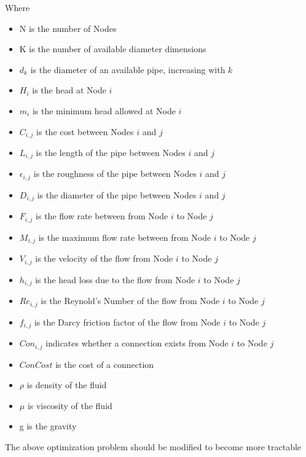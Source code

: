 \documentclass[12pt]{article}
\begin{document}
Where
\begin{itemize}
\item N is the number of Nodes
\item K is the number of available diameter dimensions
\item $d_{k}$ is the diameter of an available pipe, increasing with $k$
\item $H_{i}$ is the head at Node $i$
\item $m_{i}$ is the minimum head allowed at Node $i$
\item $C_{i,j}$ is the cost between Nodes $i$ and $j$
\item $L_{i,j}$ is the length of the pipe between Nodes $i$ and $j$
\item $\epsilon_{i,j}$ is the roughness of the pipe between Nodes $i$ and $j$
\item $D_{i,j}$ is the diameter of the pipe between Nodes $i$ and $j$
\item $F_{i,j}$ is the flow rate between from Node $i$ to Node $j$
\item $M_{i,j}$ is the maximum flow rate between from Node $i$ to Node $j$
\item $V_{i,j}$ is the velocity of the flow from Node $i$ to Node $j$
\item $h_{i,j}$ is the head loss due to the flow from Node $i$ to Node $j$
\item $Re_{i,j}$ is the Reynold's Number of the flow from Node $i$ to Node $j$
\item $f_{i,j}$ is the Darcy friction factor of the flow from Node $i$ to Node $j$
\item $Con_{i,j}$ indicates whether a connection exists from Node $i$ to Node $j$
\item $ConCost$ is the cost of a connection
\item $\rho$ is density of the fluid
\item $\mu$ is viscosity of the fluid
\item g is the gravity
\end{itemize}

The above optimization problem should be modified to become more tractable
\end{document}
